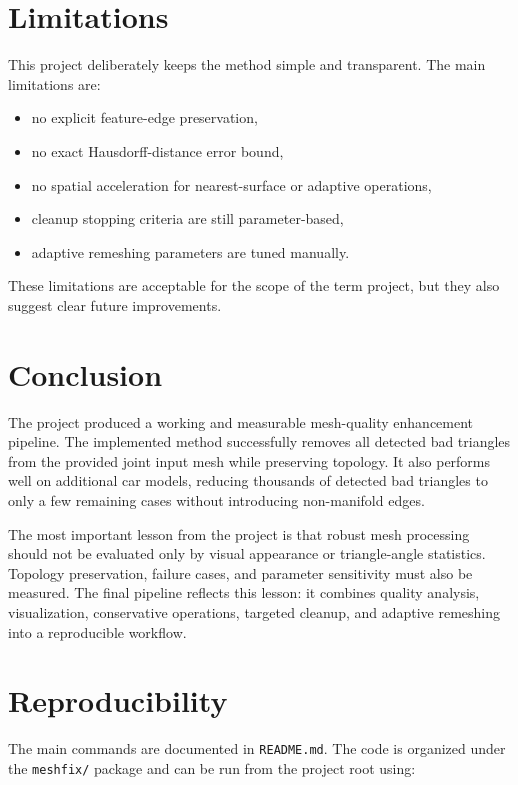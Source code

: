 \documentclass[11pt,a4paper]{article}
\newcommand{\code}[1]{\texttt{#1}}
\begin{document}
\section{Limitations}

This project deliberately keeps the method simple and transparent. The main limitations are:
\begin{itemize}
  \item no explicit feature-edge preservation,
  \item no exact Hausdorff-distance error bound,
  \item no spatial acceleration for nearest-surface or adaptive operations,
  \item cleanup stopping criteria are still parameter-based,
  \item adaptive remeshing parameters are tuned manually.
\end{itemize}

These limitations are acceptable for the scope of the term project, but they also suggest clear future improvements.

\section{Conclusion}

The project produced a working and measurable mesh-quality enhancement pipeline. The implemented method successfully removes all detected bad triangles from the provided joint input mesh while preserving topology. It also performs well on additional car models, reducing thousands of detected bad triangles to only a few remaining cases without introducing non-manifold edges.

The most important lesson from the project is that robust mesh processing should not be evaluated only by visual appearance or triangle-angle statistics. Topology preservation, failure cases, and parameter sensitivity must also be measured. The final pipeline reflects this lesson: it combines quality analysis, visualization, conservative operations, targeted cleanup, and adaptive remeshing into a reproducible workflow.

\section{Reproducibility}

The main commands are documented in \code{README.md}. The code is organized under the \code{meshfix/} package and can be run from the project root using:
\end{document}

